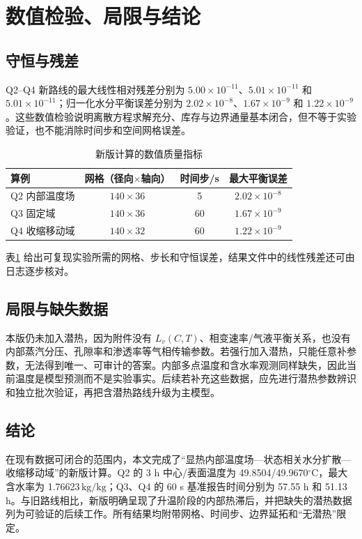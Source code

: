 \documentclass[withoutpreface,bwprint]{cumcmthesis}
\newcommand{\kgkg}{\ensuremath{\mathrm{kg/kg}}}
\begin{document}
\section{数值检验、局限与结论}
\subsection{守恒与残差}
Q2--Q4 新路线的最大线性相对残差分别为 $5.00\times10^{-11}$、$5.01\times10^{-11}$ 和 $5.01\times10^{-11}$；归一化水分平衡误差分别为 $2.02\times10^{-8}$、$1.67\times10^{-9}$ 和 $1.22\times10^{-9}$。这些数值检验说明离散方程求解充分、库存与边界通量基本闭合，但不等于实验验证，也不能消除时间步和空间网格误差。
\begin{table}[H]\centering\caption{新版计算的数值质量指标}\label{tab:checks}
\begin{tabular}{lccc}\toprule
算例&网格（径向$\times$轴向）&时间步/s&最大平衡误差\\\midrule
Q2 内部温度场&$140\times36$&5&$2.02\times10^{-8}$\\
Q3 固定域&$140\times36$&60&$1.67\times10^{-9}$\\
Q4 收缩移动域&$140\times32$&60&$1.22\times10^{-9}$\\
\bottomrule\end{tabular}\end{table}
表\ref{tab:checks} 给出可复现实验所需的网格、步长和守恒误差，结果文件中的线性残差还可由日志逐步核对。

\subsection{局限与缺失数据}
本版仍未加入潜热，因为附件没有 $L_v(C,T)$、相变速率/气液平衡关系，也没有内部蒸汽分压、孔隙率和渗透率等气相传输参数。若强行加入潜热，只能任意补参数，无法得到唯一、可审计的答案。内部多点温度和含水率观测同样缺失，因此当前温度是模型预测而不是实验事实。后续若补充这些数据，应先进行潜热参数辨识和独立批次验证，再把含潜热路线升级为主模型。

\subsection{结论}
在现有数据可闭合的范围内，本文完成了“显热内部温度场—状态相关水分扩散—收缩移动域”的新版计算。Q2 的 3 h 中心/表面温度为 49.8504/49.9670\(^{\circ}\mathrm C\)，最大含水率为 1.76623\,\kgkg；Q3、Q4 的 60 s 基准报告时间分别为 57.55 h 和 51.13 h。与旧路线相比，新版明确呈现了升温阶段的内部热滞后，并把缺失的潜热数据列为可验证的后续工作。所有结果均附带网格、时间步、边界延拓和“无潜热”限定。
\end{document}
